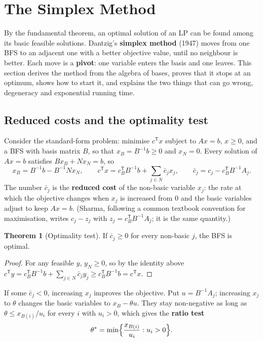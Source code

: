 \documentclass[11pt,a4paper]{article}
\numberwithin{equation}{section}
\theoremstyle{definition}
\newtheorem{thm}{Theorem}[subsection]
\begin{document}
\section{The Simplex Method}
\label{sec:simplex}

By the fundamental theorem, an optimal solution of an LP can be found among its basic feasible solutions. Dantzig's \textbf{simplex method} (1947) moves from one BFS to an adjacent one with a better objective value, until no neighbour is better. Each move is a \textbf{pivot}: one variable enters the basis and
one leaves. This section derives the method from the algebra of bases, proves that it stops at an optimum, shows how to start it, and explains the two things that can go wrong, degeneracy and exponential running time.

\subsection{Reduced costs and the optimality test}
\label{ssec:reducedcosts}

Consider the standard-form problem: minimise $c^{\mathsf T}x$ subject to $Ax = b$, $x \geq 0$, and a BFS with basis matrix $B$, so that $x_B = B^{-1}b \geq 0$ and $x_N = 0$. Every solution of $Ax = b$ satisfies $Bx_B + Nx_N = b$, so
\[
x_B = B^{-1}b - B^{-1}Nx_N, \qquad c^{\mathsf T}x = c_B^{\mathsf T}B^{-1}b + \sum_{j \in N}\bar c_jx_j, \qquad \bar c_j = c_j - c_B^{\mathsf T}B^{-1}A_j .
\]
The number $\bar c_j$ is the \textbf{reduced cost} of the non-basic variable $x_j$: the rate at which the objective changes when $x_j$ is increased from $0$ and the basic variables adjust to keep $Ax = b$. (Sharma, following a common textbook convention for maximisation, writes $c_j - z_j$ with
$z_j = c_B^{\mathsf T}B^{-1}A_j$; it is the same quantity.)

\begin{thm}[Optimality test]
\label{thm:optimality}
If $\bar c_j \geq 0$ for every non-basic $j$, the BFS is optimal.
\end{thm}

\begin{proof}
For any feasible $y$, $y_N \geq 0$, so by the identity above $c^{\mathsf T}y = c_B^{\mathsf T}B^{-1}b + \sum_{j \in N}\bar c_jy_j \geq c_B^{\mathsf T}B^{-1}b = c^{\mathsf T}x$.
\end{proof}

If some $\bar c_j < 0$, increasing $x_j$ improves the objective. Put $u = B^{-1}A_j$; increasing $x_j$ to $\theta$ changes the basic variables to $x_B - \theta u$. They stay non-negative as long as $\theta \leq x_{B(i)}/u_i$ for every $i$ with $u_i > 0$, which gives the \textbf{ratio test}
\[
\theta^* = \min\Bigl\{\frac{x_{B(i)}}{u_i} : u_i > 0\Bigr\} .
\]
\end{document}
